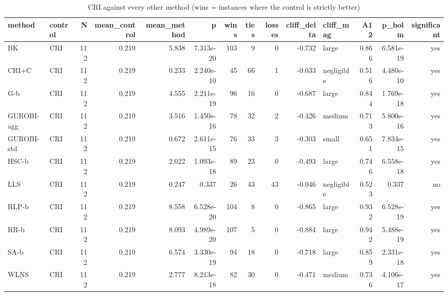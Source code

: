 \begin{table}[htbp]
\centering
\small
\caption{CRI against every other method (wins = instances where the control is strictly better)}
\label{tab:E4a_equal_budgets_b10_vs_CRI}
\begin{tabular}{llrrrrrrrrlrrr}
\toprule
method & control & N & mean\_control & mean\_method & p & wins & ties & losses & cliff\_delta & cliff\_mag & A12 & p\_holm & significant \\
\midrule
BK & CRI & 112 & 0.219 & 5.838 & 7.313e-20 & 103 & 9 & 0 & -0.732 & large & 0.866 & 6.581e-19 & yes \\
CRI+C & CRI & 112 & 0.219 & 0.233 & 2.240e-10 & 45 & 66 & 1 & -0.033 & negligible & 0.516 & 4.480e-10 & yes \\
G-b & CRI & 112 & 0.219 & 4.555 & 2.211e-19 & 96 & 16 & 0 & -0.687 & large & 0.844 & 1.769e-18 & yes \\
GUROBI-agg & CRI & 112 & 0.219 & 3.516 & 1.450e-16 & 78 & 32 & 2 & -0.426 & medium & 0.713 & 5.800e-16 & yes \\
GUROBI-std & CRI & 112 & 0.219 & 0.672 & 2.611e-15 & 76 & 33 & 3 & -0.303 & small & 0.651 & 7.834e-15 & yes \\
HSC-b & CRI & 112 & 0.219 & 2.022 & 1.093e-18 & 89 & 23 & 0 & -0.493 & large & 0.746 & 6.558e-18 & yes \\
LLS & CRI & 112 & 0.219 & 0.247 & 0.337 & 26 & 43 & 43 & -0.046 & negligible & 0.523 & 0.337 & no \\
RLP-b & CRI & 112 & 0.219 & 8.558 & 6.528e-20 & 104 & 8 & 0 & -0.865 & large & 0.932 & 6.528e-19 & yes \\
RR-b & CRI & 112 & 0.219 & 8.093 & 4.989e-20 & 107 & 5 & 0 & -0.884 & large & 0.942 & 5.488e-19 & yes \\
SA-b & CRI & 112 & 0.219 & 6.574 & 3.330e-19 & 94 & 18 & 0 & -0.718 & large & 0.859 & 2.331e-18 & yes \\
WLNS & CRI & 112 & 0.219 & 2.777 & 8.213e-18 & 82 & 30 & 0 & -0.471 & medium & 0.736 & 4.106e-17 & yes \\
\bottomrule
\end{tabular}
\end{table}
